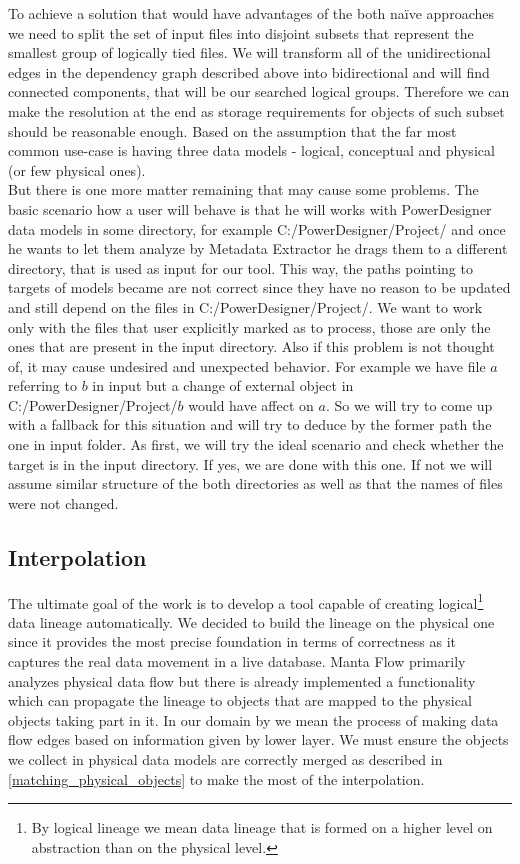 To achieve a solution that would have advantages of the both naïve approaches we need to split the set of input files into disjoint subsets that represent the smallest group of logically tied files. We will transform all of the unidirectional edges in the dependency graph described above into bidirectional and will find connected components, that will be our searched logical groups. Therefore we can make the resolution at the end as storage requirements for objects of such subset should be reasonable enough. Based on the assumption that the far most common use-case is having three data models - logical, conceptual and physical (or few physical ones). \\

But there is one more matter remaining that may cause some problems. The basic scenario how a user will behave is that he will works with PowerDesigner data models in some directory, for example C:/PowerDesigner/Project/ and once he wants to let them analyze by Metadata Extractor he drags them to a different directory, that is used as input for our tool.
This way, the paths pointing to targets of models became are not correct since they have no reason to be updated and still depend on the files in C:/PowerDesigner/Project/. We want to work only with the files that user explicitly marked as to process, those are only the ones that are present in the input directory. Also if this problem is not thought of, it may cause undesired and unexpected behavior. 
For example we have file $a$ referring to $b$ in input but a change of external object in C:/PowerDesigner/Project/$b$ would have affect on $a$.
So we will try to come up with a fallback for this situation and will try to deduce by the former path the one in input folder.
As first, we will try the ideal scenario and check whether the target is in the input directory. If yes, we are done with this one.  
If not we will assume similar structure of the both directories as well as that the names of files were not changed.

\subsection{Interpolation}
The ultimate goal of the work is to develop a tool capable of creating logical\footnote{By logical lineage we mean data lineage that is formed on a higher level on abstraction than on the physical level.} data lineage automatically.
We decided to build the lineage on the physical one since it provides the most precise foundation in terms of correctness as it captures the real data movement in a live database.
Manta Flow primarily analyzes physical data flow but there is already implemented a functionality which can propagate the lineage to objects that are mapped to the physical objects taking part in it. 
In our domain by  we mean the process of making data flow edges based on information given by lower layer.
We must ensure the objects we collect in physical data models are correctly merged as described in \autoref{matching_physical_objects} to make the most of the interpolation.

